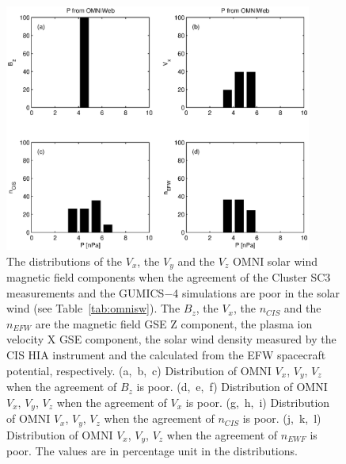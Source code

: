 \documentclass[linenumbers,draft]{agujournal}
\begin{document}
\begin{figure}[h]
\centering
\includegraphics[width=0.9\textwidth,angle=0]{swe-2020-corr-f16.eps}
\caption{The distributions of the $V_{x}$, the $V_{y}$  and the $V_{z}$ OMNI solar wind magnetic field components when the agreement of the Cluster SC3 measurements and the GUMICS$-$4 simulations are poor in the solar wind (see Table~\ref{tab:omnisw}). The $B_{z}$, the $V_{x}$, the $n_{CIS}$ and the $n_{EFW}$ are the magnetic field GSE Z component, the plasma ion velocity X GSE component, the  solar wind density measured by the CIS HIA instrument and the calculated from the EFW spacecraft potential, respectively. (a,~b,~c) Distribution of OMNI $V_{x}$, $V_{y}$, $V_{z}$ when the agreement of $B_{z}$ is poor. (d,~e,~f) Distribution of OMNI  $V_{x}$, $V_{y}$, $V_{z}$ when the agreement of $V_{x}$ is poor. (g,~h,~i) Distribution of OMNI $V_{x}$, $V_{y}$, $V_{z}$ when the agreement of $n_{CIS}$ is poor. (j,~k,~l) Distribution of OMNI $V_{x}$, $V_{y}$, $V_{z}$ when the agreement of $n_{EWF}$ is poor. The values are in percentage unit in the distributions.}
\label{fig:swomnivxyz}
\end{figure}

\pagebreak
\end{document}
